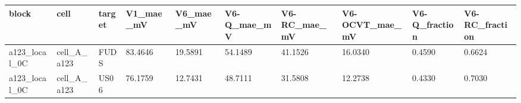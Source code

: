 \begin{tabular}{llllllllll}
\hline
block & cell & target & V1\_mae\_mV & V6\_mae\_mV & V6-Q\_mae\_mV & V6-RC\_mae\_mV & V6-OCVT\_mae\_mV & V6-Q\_fraction & V6-RC\_fraction \\
\hline
a123\_local\_0C & cell\_A\_a123 & FUDS & 83.4646 & 19.5891 & 54.1489 & 41.1526 & 16.0340 & 0.4590 & 0.6624 \\
a123\_local\_0C & cell\_A\_a123 & US06 & 76.1759 & 12.7431 & 48.7111 & 31.5808 & 12.2738 & 0.4330 & 0.7030 \\
\hline
\end{tabular}
